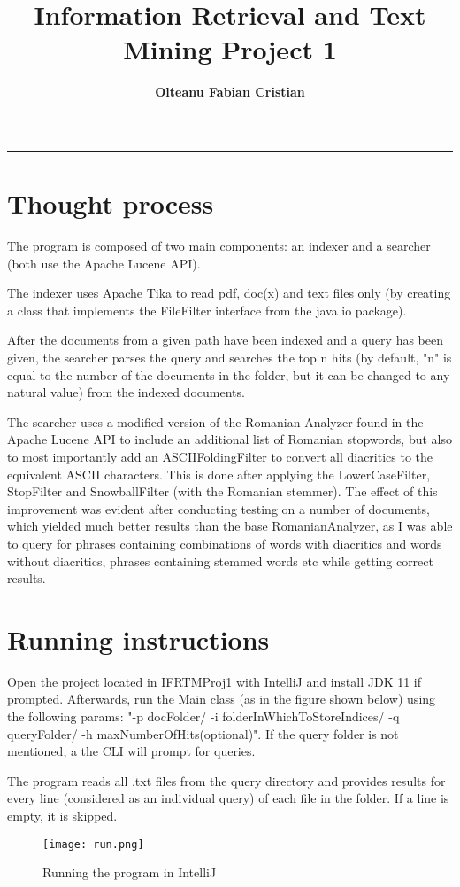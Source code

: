 \documentclass{article}
\author{\textbf{Olteanu Fabian Cristian}}
\affil{FMI, AI Master, Year 2
}
\title{\textbf{\huge Information Retrieval and Text Mining Project 1}}
\date{}
\begin{document}
\pagestyle{headings}	
\newpage
\setcounter{page}{1}
\renewcommand{\thepage}{\arabic{page}}


	
	
\setlength{\parskip}{0.5em}
	
\maketitle
	
\noindent\rule{15cm}{0.4pt}

\section{Thought process}
The program is composed of two main components: an indexer and a searcher (both use the Apache Lucene API). 

The indexer uses Apache Tika to read pdf, doc(x) and text files only (by creating a class that implements the FileFilter interface from the java io package).  

After the documents from a given path have been indexed and a query has been given, the searcher parses the query and searches the top n hits (by default, "n" is equal to the number of the documents in the folder, but it can be changed to any natural value) from the indexed documents. 

The searcher uses a modified version of the Romanian Analyzer found in the Apache Lucene API to include an additional list of Romanian stopwords, but also to most importantly add an ASCIIFoldingFilter to convert all diacritics to the equivalent ASCII characters. This is done after applying the LowerCaseFilter, StopFilter and SnowballFilter (with the Romanian stemmer). The effect of this improvement was evident after conducting testing on a number of documents, which yielded much better results than the base RomanianAnalyzer, as I was able to query for phrases containing combinations of words with diacritics and words without diacritics, phrases containing stemmed words etc while getting correct results.

\section{Running instructions}
Open the project located in IFRTMProj1 with IntelliJ and install JDK 11 if prompted. Afterwards, run the Main class (as in the figure shown below) using the following params: "-p docFolder/ -i folderInWhichToStoreIndices/ -q queryFolder/ -h maxNumberOfHits(optional)". If the query folder is not mentioned, a the CLI will prompt for queries.

The program reads all .txt files from the query directory and provides results for every line (considered as an individual query) of each file in the folder. If a line is empty, it is skipped.

\begin{figure}[hbt!]
	\centering
	\texttt{[image: run.png]}
	\caption{Running the program in IntelliJ}
\end{figure}
\end{document}
